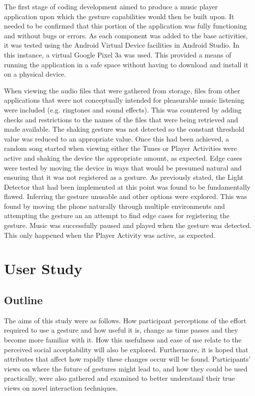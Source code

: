 \documentclass{l4proj}
\begin{document}
The first stage of coding development aimed to produce a music player application upon which the gesture capabilities would then be built upon. It needed to be confirmed that this portion of the application was fully functioning and without bugs or errors. As each component was added to the base activities, it was tested using the Android Virtual Device facilities in Android Studio. In this instance, a virtual Google Pixel 3a was used. This provided a means of running the application in a safe space without having to download and install it on a physical device. 


When viewing the audio files that were gathered from storage, files from other applications that were not conceptually intended for pleasurable music listening were included (e.g. ringtones and sound effects). This was countered by adding checks and restrictions to the names of the files that were being retrieved and made available. The shaking gesture was not detected so the constant threshold value was reduced to an appropriate value. Once this had been achieved, a random song started when viewing either the Tunes or Player Activities were active and shaking the device the appropriate amount, as expected. Edge cases were tested by moving the device in ways that would be presumed natural and ensuring that it was not registered as a gesture. As previously stated, the Light Detector that had been implemented at this point was found to be fundamentally flawed. Inferring the gesture unusable and other options were explored. This was found by moving the phone naturally through multiple environments and attempting the gesture an an attempt to find edge cases for registering the gesture. Music was successfully paused and played when the gesture was detected. This only happened when the Player Activity was active, as expected.


\chapter{User Study}

\section{Outline}
The aims of this study were as follows. How participant perceptions of the effort required to use a gesture and how useful it is, change as time passes and they become more familiar with it. How this usefulness and ease of use relate to the perceived social acceptability will also be explored. Furthermore, it is hoped that attributes that affect how rapidly these changes occur will be found. Participants' views on where the future of gestures might lead to, and how they could be used practically, were also gathered and examined to better understand their true views on novel interaction techniques.
\end{document}
